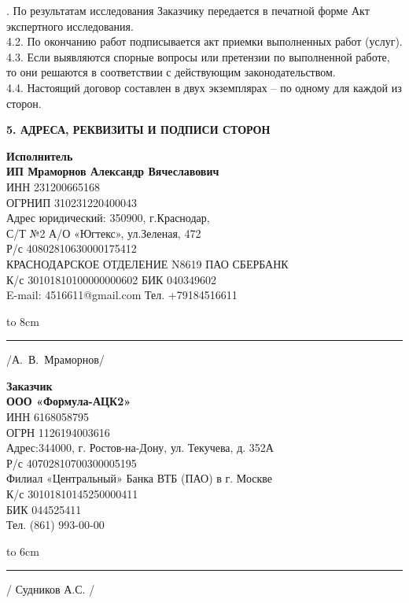 \vspace{-2mm}
. По результатам исследования Заказчику передается в печатной форме Акт экспертного исследования.\\ 
4.2. По окончанию работ подписывается акт приемки выполненных работ (услуг).\\
4.3. Если выявляются спорные вопросы или претензии по выполненной работе, то они решаются в соответствии с действующим законодательством.\\
4.4. Настоящий договор составлен в двух экземплярах – по одному для каждой из сторон.
\begin{center}
	\textbf{5. АДРЕСА, РЕКВИЗИТЫ И ПОДПИСИ СТОРОН}
\end{center}
\noindent\parbox[l][5cm]{8cm}
{\begin{flushleft}
		\small\textbf{Исполнитель\\ ИП Мраморнов Александр Вячеславович\\} 
		\footnotesize {ИНН 231200665168\\
			ОГРНИП 310231220400043}\\
		\footnotesize{Адрес юридический: 350900, г.Краснодар,\\
			С/Т №2 А/О «Югтекс», ул.Зеленая, 472\\
			Р/с 40802810630000175412 \\
			КРАСНОДАРСКОЕ ОТДЕЛЕНИЕ N8619 ПАО СБЕРБАНК\\
			К/с 30101810100000000602 БИК   040349602\\
			E-mail: 4516611@gmail.com  Тел. +79184516611 }
	\end{flushleft}
	\vspace{5mm}
	
	\hbox to 8cm{\rule{40mm}{0.1mm} /А.~В.~Мраморнов/}}\hfill\parbox[l][5cm]{8cm}
{
	\begin{flushleft}
		\small\textbf{Заказчик\\ ООО «Формула-АЦК2»\\} 
		\footnotesize {ИНН 6168058795\\
		ОГРН 1126194003616\\
		Адрес:344000, г. Ростов-на-Дону, ул. Текучева, д. 352А\\
		Р/с  40702810700300005195\\
		Филиал «Центральный» Банка ВТБ (ПАО) в г. Москве\\
		К/с 30101810145250000411\\ БИК 044525411\\
	    Тел. (861) 993-00-00\\ }
	\end{flushleft}
	\vspace{0mm}
	\hbox to 6cm{\rule{40mm}{0.1mm} / Судников  А.С. /   }}

 
